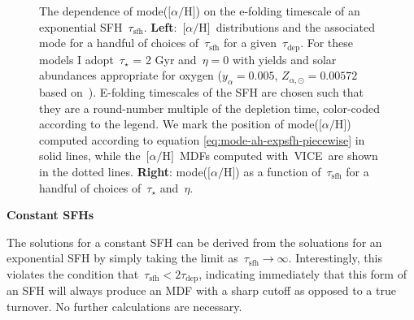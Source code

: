 \documentclass[12pt]{article}
\newcommand{\ah}{\ensuremath{\text{[$\alpha$/H]}}}
\newcommand{\timescale}[1]{\ensuremath{\tau_\text{#1}}}
\newcommand{\vice}{\textsc{VICE}}
\begin{document}
\begin{figure}
\caption{
	The dependence of mode(\ah) on the e-folding timescale of an exponential
	SFH~\timescale{sfh}.
	\textbf{Left}:~\ah~distributions and the associated mode for a handful of
	choices of~$\timescale{sfh}$ for a given~$\timescale{dep}$.
	For these models I adopt~$\tau_\star$ = 2 Gyr and~$\eta = 0$ with
	yields and solar abundances appropriate for oxygen ($y_\alpha = 0.005$,
	$Z_{\alpha,\odot} = 0.00572$ based on~\citealt{Asplund2009}).
	E-folding timescales of the SFH are chosen such that they are a
	round-number multiple of the depletion time, color-coded according to the
	legend.
	We mark the position of mode(\ah) computed according to equation
	\ref{eq:mode-ah-expsfh-piecewise} in solid lines, while the~\ah~MDFs
	computed with~\vice~are shown in the dotted lines.
	\textbf{Right}: mode(\ah) as a function of~\timescale{sfh} for a handful of
	choices of~$\tau_\star$ and~$\eta$.
}
\label{fig:mode-ah-expsfh}
\end{figure}

\par\null\par\noindent
{\large \textbf{Constant SFHs}}
\par\noindent
The solutions for a constant SFH can be derived from the soluations for an
exponential SFH by simply taking the limit
as~$\timescale{sfh} \rightarrow \infty$.
Interestingly, this violates the condition that~$\timescale{sfh} <
2\timescale{dep}$, indicating immediately that this form of an SFH will always
produce an MDF with a sharp cutoff as opposed to a true turnover.
No further calculations are necessary.
\end{document}
